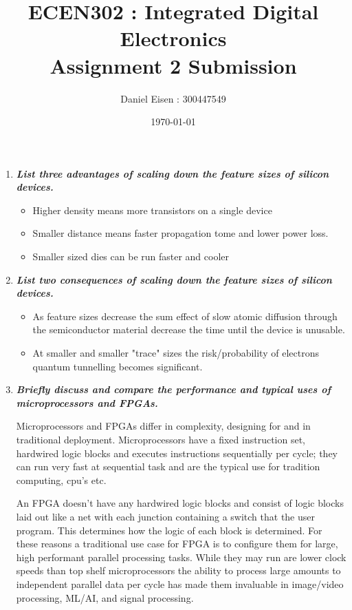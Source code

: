 \documentclass[11pt]{article}
\title{ECEN302 : Integrated Digital Electronics \\ Assignment 2 Submission}
\author{Daniel Eisen : 300447549}
\date{\today}
\begin{document}
\begin{preview}
\maketitle
\begin{enumerate}
    \item \textit{\textbf{List three advantages of scaling down the feature sizes of silicon devices.}}
    
    \begin{itemize}
        \item Higher density means more transistors on a single device
        \item Smaller distance means faster propagation tome and lower power loss.
        \item Smaller sized dies can be run faster and cooler 
    \end{itemize}
    
    \item \textit{\textbf{List two consequences of scaling down the feature sizes of silicon devices.}}
    
    \begin{itemize}
        \item As feature sizes decrease the sum effect of slow atomic diffusion through the semiconductor material decrease the time until the device is unusable.
        \item At smaller and smaller "trace" sizes the risk/probability of electrons quantum tunnelling becomes significant.  
    \end{itemize}
    
    \item \textit{\textbf{Briefly discuss and compare the performance and typical uses of microprocessors and FPGAs.}}
    
    Microprocessors and FPGAs differ in complexity, designing for and in traditional deployment.
    Microprocessors have a fixed instruction set, hardwired logic blocks and executes instructions sequentially per cycle; they can run very fast at sequential task and are the typical use for tradition computing, cpu's etc.
    
    An FPGA doesn’t have any hardwired logic blocks and consist of logic blocks laid out like a net with each junction containing a switch that the user program. This determines how the logic of each block is determined. For these reasons a traditional use case for FPGA is to configure them for large, high performant parallel processing tasks. While they may run are lower clock speeds than top shelf microprocessors the ability to process large amounts to independent parallel data per cycle has made them invaluable in image/video processing, ML/AI, and signal processing. 
    

\end{enumerate}
\end{preview}
\end{document}
